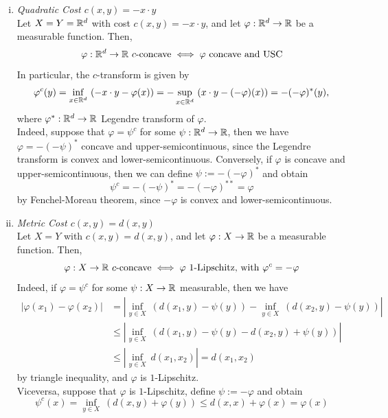 \documentclass[../main.tex]{subfiles}
\begin{document}
\begin{example} \hfill
    \begin{enumerate}[(i)]
        \item \textit{Quadratic Cost $c(x, y) = -x \cdot y$} \\
        Let $X= Y = \mathbb{R}^d$ with cost $c(x, y) = - x\cdot y$, and let $\varphi: \mathbb{R}^d \to \mathbb{R}$ be a measurable function. Then, 
        $$
        \varphi: \mathbb{R}^d \to \mathbb{R} \ c\text{-concave} \iff \varphi \ \text{concave and USC}
        $$
        In particular, the $c$-transform is given by
        $$
        \varphi^c(y) 
        = \inf_{x\in\mathbb{R}^d} \ (-x\cdot y - \varphi(x)) 
        = - \sup_{x\in\mathbb{R}^d} \ (x\cdot y - (-\varphi)(x))
        = - (-\varphi)^*(y),
        $$
        where $\varphi^*: \mathbb{R}^d \to \mathbb{R}$ Legendre transform of $\varphi$. \\
        Indeed, suppose that $\varphi= \psi^c$ for some $\psi: \mathbb{R}^d \to \mathbb{R}$, then we have $\varphi= -(-\psi)^*$ concave and upper-semicontinuous, since the Legendre transform is convex and lower-semicontinuous. Conversely, if $\varphi$ is concave and upper-semicontinuous, then we can define $\psi := -(-\varphi)^*$ and obtain
        $$
        \psi^c = -(-\psi)^* = -(-\varphi)^{**} = \varphi
        $$
        by Fenchel-Moreau theorem, since $-\varphi$ is convex and lower-semicontinuous.
        \item \textit{Metric Cost $c(x, y) = d(x, y)$} \\
        Let $X=Y$ with $c(x, y) = d(x, y)$, and let $\varphi: X \to \mathbb{R}$ be a measurable function. Then, 
        $$
        \varphi: X \to \mathbb{R} \ c\text{-concave} \iff \varphi \ 1\text{-Lipschitz, with } \varphi^c = -\varphi 
        $$
        Indeed, if $\varphi = \psi^c$ for some $\psi: X \to \mathbb{R}$ measurable, then we have
        \begin{align*}
            |\varphi(x_1) - \varphi(x_2)| 
            &= |\inf_{y\in X} \ (d(x_1, y) - \psi(y)) - \inf_{y\in X} \ (d(x_2, y) - \psi(y))| \\
            &\leq |\inf_{y\in X} \ (d(x_1, y) - \psi(y) - d(x_2, y) +\psi(y))| \\
            &\leq |\inf_{y\in X} \ d(x_1, x_2)| = d(x_1, x_2)
        \end{align*}
        by triangle inequality, and $\varphi$ is $1$-Lipschitz. \\
        Viceversa, suppose that $\varphi$ is $1$-Lipschitz, define $\psi:=-\varphi$ and obtain
        $$
        \psi^c(x)  = \inf_{y\in X} \ (d(x, y) + \varphi(y)) \leq d(x, x) + \varphi(x) = \varphi(x)
$$
\end{enumerate}
\end{example}
\end{document}
